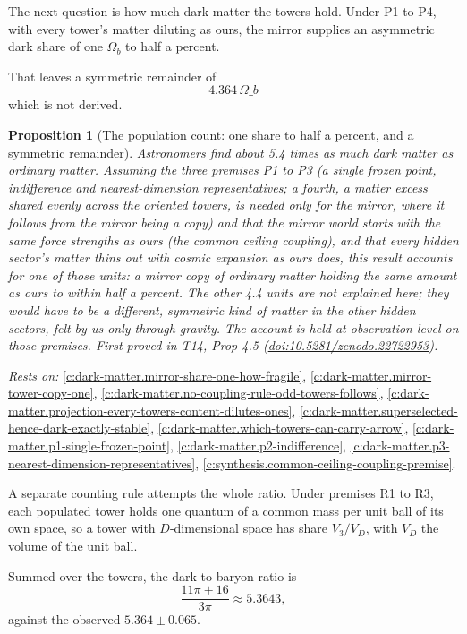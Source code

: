 \documentclass[11pt]{article}
\newtheorem{proposition}[theorem]{Proposition}
\theoremstyle{definition}
\theoremstyle{plain}
\begin{document}
The next question is how much dark matter the towers hold. Under P1 to P4, with every tower's matter diluting as ours, the mirror supplies an asymmetric dark share of one $\Omega_{b}$ to half a percent.

That leaves a symmetric remainder of \[ 4.364\,\Omega\_{b} \] which is not derived.

\begin{proposition}[The population count: one share to half a percent, and a symmetric remainder]\label{c:dark-matter.population-count-one-share-half-percent}
Astronomers find about 5.4 times as much dark matter as ordinary matter. Assuming the three premises P1 to P3 (a single frozen point, indifference and nearest-dimension representatives; a fourth, a matter excess shared evenly across the oriented towers, is needed only for the mirror, where it follows from the mirror being a copy) and that the mirror world starts with the same force strengths as ours (the common ceiling coupling), and that every hidden sector's matter thins out with cosmic expansion as ours does, this result accounts for one of those units: a mirror copy of ordinary matter holding the same amount as ours to within half a percent. The other 4.4 units are not explained here; they would have to be a different, symmetric kind of matter in the other hidden sectors, felt by us only through gravity. The account is held at observation level on those premises.
\emph{First proved in} T14, Prop 4.5 (\href{https://doi.org/10.5281/zenodo.22722953}{doi:10.5281/zenodo.22722953}).
\end{proposition}
\noindent\emph{Rests on:} \ref{c:dark-matter.mirror-share-one-how-fragile}, \ref{c:dark-matter.mirror-tower-copy-one}, \ref{c:dark-matter.no-coupling-rule-odd-towers-follows}, \ref{c:dark-matter.projection-every-towers-content-dilutes-ones}, \ref{c:dark-matter.superselected-hence-dark-exactly-stable}, \ref{c:dark-matter.which-towers-can-carry-arrow}, \ref{c:dark-matter.p1-single-frozen-point}, \ref{c:dark-matter.p2-indifference}, \ref{c:dark-matter.p3-nearest-dimension-representatives}, \ref{c:synthesis.common-ceiling-coupling-premise}.

A separate counting rule attempts the whole ratio. Under premises R1 to R3, each populated tower holds one quantum of a common mass per unit ball of its own space, so a tower with $D$-dimensional space has share $V_{3}/V_{D}$, with $V_{D}$ the volume of the unit ball.

Summed over the towers, the dark-to-baryon ratio is \[ \frac{11\pi + 16}{3\pi} \approx 5.3643, \] against the observed $5.364 \pm 0.065$.
\end{document}
